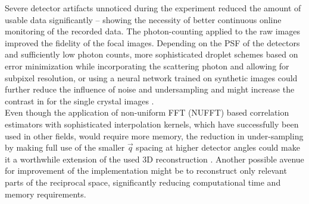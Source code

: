 Severe detector artifacts unnoticed during the experiment reduced the amount of usable data significantly -- showing the necessity of better continuous online monitoring of the recorded data. The photon-counting applied to the raw images improved the fidelity of the focal images. Depending on the PSF of the detectors and sufficiently low photon counts, more sophisticated droplet schemes based on error minimization while incorporating the scattering photon and allowing for subpixel resolution, or using a neural network trained on synthetic images could further reduce the influence of noise and undersampling and might increase the contrast in for the single crystal images \cite{baumann2018,collaboration2014,schayck2020,sun2020}.\\
Even though the application of non-uniform FFT (NUFFT) based correlation estimators with sophisticated interpolation kernels, which have successfully been used in other fields, would require more memory, the reduction in under-sampling by making full use of the smaller $\vec{q}$ spacing at higher detector angles could make it a worthwhile extension of the used 3D reconstruction \cite{laguna1998,yang2008,chang2020}. Another possible avenue for improvement of the implementation might be to reconstruct only relevant parts of the reciprocal space, significantly reducing computational time and memory requirements. 

